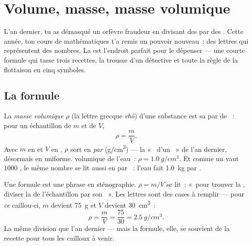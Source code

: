 \chapter{Volume, masse, masse volumique}\label{ch:g7:volume-mass-density}

L'an dernier, tu as démasqué un orfèvre fraudeur en divisant des
 par des . Cette année, ton cours de
mathématiques t'a remis un pouvoir nouveau~: des lettres qui
représentent des nombres. La  est l'endroit parfait
pour le dépenser --- une courte formule qui tasse trois recettes, la
trousse d'un détective et toute la règle de la flottaison en cinq
symboles.

\section{La formule}

\begin{definition}\label{def:g7:volume-mass-density:formula}
La \emph{masse volumique} $\rho$ (la lettre
grecque \emph{rhô}) d'une substance est sa  par  de
~: pour un échantillon de  $m$ et de  $V$,
\[
\rho = \frac{m}{V}.
\]
Avec $m$ en  et $V$ en , $\rho$ sort en
\emph{ par } (\unit{g/cm^3}) --- la «~
d'un ~» de l'an dernier, désormais en uniforme. 
volumique de l'eau~: $\rho = \qty{1.0}{g/cm^3}$. Et comme un 
vaut $1000$ , le même nombre se lit aussi en
 par ~: l'eau fait \qty{1.0}{kg} par .
\end{definition}

\begin{example}\label{ex:g7:volume-mass-density:reading}
Une formule est une phrase en sténographie. $\rho = m/V$ se lit~:
«~pour trouver la , diviser la  de l'échantillon
par son ~». Les lettres sont des cases à remplir --- pour
\emph{ce} caillou-ci, $m$ devient \qty{75}{g} et $V$ devient
\qty{30}{cm^3}~:
\[
\rho = \frac{m}{V} = \frac{75}{30} = \qty{2.5}{g/cm^3}.
\]
La même division que l'an dernier --- mais la formule, elle, se
souvient de la recette pour tous les cailloux à venir.
\end{example}

